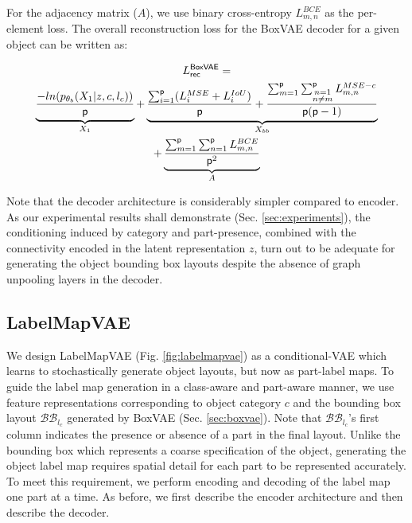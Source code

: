 \documentclass[runningheads]{llncs}
\begin{document}
For the adjacency matrix ($A$), we use binary cross-entropy $L_{m,n}^{BCE}$ as the per-element loss. The overall reconstruction loss for the BoxVAE decoder for a given object can be written as:



\begin{multline}
     L_{\mathsf{rec}}^{\mathsf{BoxVAE}} = \\
     \underbrace{\frac{- ln (p_{{\tiny \theta_{b}}}(X_1|z,c,l_c))}{\mathsf{p}}}_{X_1} +
     \underbrace{\frac{\sum_{i=1}^{\mathsf{p}} ( L_i^{MSE} + L_i^{IoU} )}{\mathsf{p}} +   \frac{\sum_{m=1}^{\mathsf{p}} \sum_{\substack{n=1\\n \neq m}}^{\mathsf{p}} L_{m,n}^{MSE-c}}{\mathsf{p} (\mathsf{p}-1)}}_{X_{bb}} \\+
    \underbrace{\frac{\sum_{m=1}^{\mathsf{p}} \sum_{n=1}^{\mathsf{p}} L_{m,n}^{BCE}}{\mathsf{p}^2}}_{A}
\label{eqn:boxvae-recons-loss}
\end{multline}

Note that the decoder architecture is considerably simpler compared to encoder. As our experimental results shall demonstrate (Sec. \ref{sec:experiments}), the conditioning induced by category and part-presence, combined with the connectivity encoded in the latent representation $z$, turn out to be adequate for generating the object bounding box layouts despite the absence of graph unpooling layers in the decoder.

\subsection{LabelMapVAE}
\label{sec:labelmapvae}

We design LabelMapVAE (Fig. \ref{fig:labelmapvae}) as a conditional-VAE which learns to stochastically generate object layouts, but now as part-label maps. To guide the label map generation in a class-aware and part-aware manner, we use feature representations corresponding to object category $c$ and the bounding box layout $\mathcal{BB}_{l_c}$ generated by BoxVAE (Sec. \ref{sec:boxvae}). Note that $\mathcal{BB}_{l_c}$'s first column indicates the presence or absence of a part in the final layout. Unlike the bounding box which represents a coarse specification of the object, generating the object label map requires spatial detail for each part to be represented accurately. To meet this requirement, we perform encoding and decoding of the label map one part at a time. As before, we first describe the encoder architecture and then describe the decoder.
\end{document}
